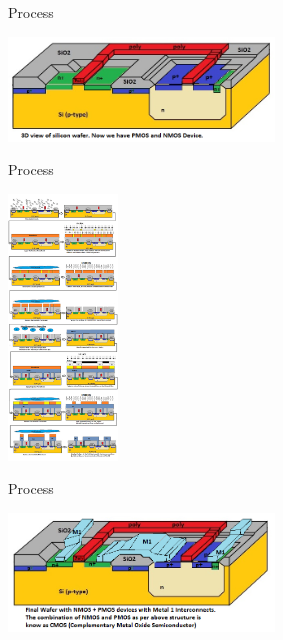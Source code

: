 \documentclass[9pt]{beamer}
\begin{document}
\begin{frame}{Process}
	\begin{center}
		\includegraphics[width=200pt]{end5.png}
	\end{center}
\end{frame}

\begin{frame}{Process}
	\begin{center}
		\includegraphics[height=200pt]{process6.png}
	\end{center}
\end{frame}

\begin{frame}{Process}
	\begin{center}
		\includegraphics[width=200pt]{end6.png}
	\end{center}
\end{frame}

\section[Conclusion]{}
\end{document}
